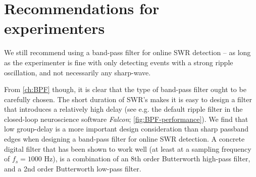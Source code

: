 \section{Recommendations for experimenters}
\label{sec:recommend}

We still recommend using a band-pass filter for online SWR detection -- as long as the experimenter is fine with only detecting events with a strong ripple oscillation, and not necessarily any sharp-wave.

From \cref{ch:BPF} though, it is clear that the type of band-pass filter ought to be carefully chosen. The short duration of SWR's makes it is easy to design a filter that introduces a relatively high delay (see e.g. the default ripple filter in the closed-loop neuroscience software \emph{Falcon}; \cref{fig:BPF-performance}). We find that low group-delay is a more important design consideration than sharp passband edges when designing a band-pass filter for online SWR detection. A concrete digital filter that has been shown to work well (at least at a sampling frequency of $f_s = 1000$ Hz), is a combination of an 8th order Butterworth high-pass filter, and a 2nd order Butterworth low-pass filter.
